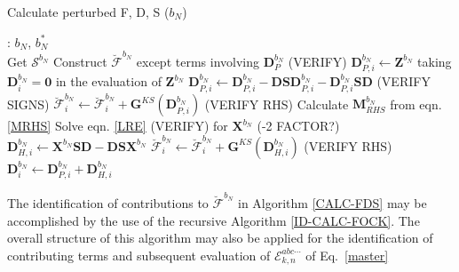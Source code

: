 \documentclass[%
 reprint,
 amsmath,amssymb,
 aps,
]{revtex4-1}
\begin{document}
\begin{algorithm}
\caption{Calculate perturbed F, D, S ($b_{N}$)}
\label{CALC-FDS}
\begin{algorithmic}
: $b_{N}$, $b_{N}^{*}$\\

\State Get $\bm{\mathcal{S}}^{b_N}$
\State Construct $\breve{\bm{\mathcal{F}}}^{b_N}$ except terms involving $\mathbf{D}_{P}^{b_N}$ (VERIFY)
\State  $\mathbf{D}_{P, i}^{b_N} \gets \mathbf{Z}^{b_N}$ taking $\mathbf{D}_{i}^{b_N} = \mathbf{0}$ in the evaluation of $\mathbf{Z}^{b_N}$
\State  $\mathbf{D}_{P, i}^{b_N} \gets \mathbf{D}_{P, i}^{b_N} - \mathbf{D} \mathbf{S} \mathbf{D}_{P, i}^{b_N} - \mathbf{D}_{P, i}^{b_N} \mathbf{S} \mathbf{D}$ (VERIFY SIGNS)
 \State $\breve{\bm{\mathcal{F}}}_{i}^{b_N} \gets \breve{\bm{\mathcal{F}}}_{i}^{b_N} + \mathbf{G}^{KS}(\mathbf{D}^{b_N}_{P, i})$ (VERIFY RHS)
\State  Calculate $\mathbf{M}_{RHS}^{b_N}$ from eqn. \eqref{MRHS}
\State  Solve eqn. \eqref{LRE} (VERIFY) for $\mathbf{X}^{b_N}$ (-2 FACTOR?)
\State  $\mathbf{D}_{H, i}^{b_N} \gets \mathbf{X}^{b_N} \mathbf{S} \mathbf{D} - \mathbf{D} \mathbf{S} \mathbf{X}^{b_N}$
\State  $\breve{\bm{\mathcal{F}}}_{i}^{b_N} \gets \breve{\bm{\mathcal{F}}}_{i}^{b_N} + \mathbf{G}^{KS}(\mathbf{D}^{b_N}_{H, i})$ (VERIFY RHS)
\State  $\mathbf{D}_{i}^{b_N} \gets \mathbf{D}_{P, i}^{b_N} + \mathbf{D}_{H, i}^{b_N}$
\EndFor
\end{algorithmic}
\end{algorithm}

The identification of contributions to $\breve{\bm{\mathcal{F}}}^{b_N}$ in
Algorithm \ref{CALC-FDS} may be accomplished by the use of the recursive
Algorithm \ref{ID-CALC-FOCK}. The overall structure of this algorithm may also
be applied for the identification of contributing terms and subsequent
evaluation of $\mathcal{E}_{k,n}^{abc\cdots}$ of Eq.~\eqref{master}

\end{document}

